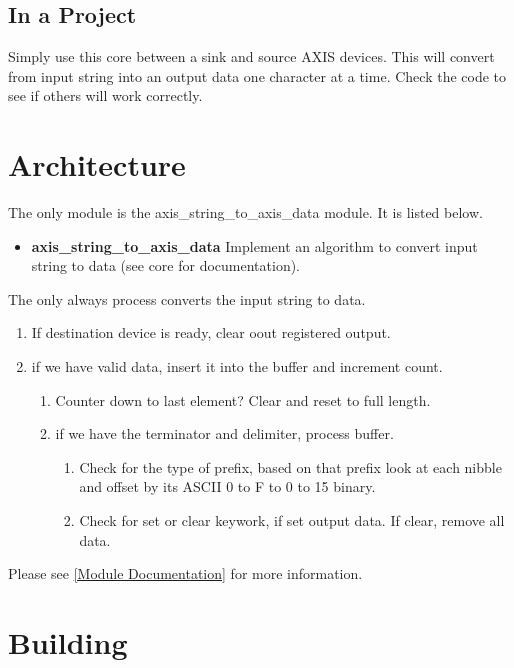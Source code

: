 

\subsection{In a Project}
\par
Simply use this core between a sink and source AXIS devices. This will convert from input string into an output data one character at a time.
Check the code to see if others will work correctly.

\section{Architecture}
\par
The only module is the axis\_string\_to\_axis\_data module. It is listed below.

\begin{itemize}
  \item \textbf{axis\_string\_to\_axis\_data } Implement an algorithm to convert input string to data (see core for documentation).
\end{itemize}

\par
The only always process converts the input string to data.
\begin{enumerate}
\item If destination device is ready, clear oout registered output.
\item if we have valid data, insert it into the buffer and increment count.
  \begin{enumerate}
    \item Counter down to last element? Clear and reset to full length.
    \item if we have the terminator and delimiter, process buffer.
    \begin{enumerate}
      \item Check for the type of prefix, based on that prefix look at each nibble and offset by its ASCII 0 to F to 0 to 15 binary.
      \item Check for set or clear keywork, if set output data. If clear, remove all data.
    \end{enumerate}
  \end{enumerate}
\end{enumerate}

Please see \ref{Module Documentation} for more information.

\section{Building}

